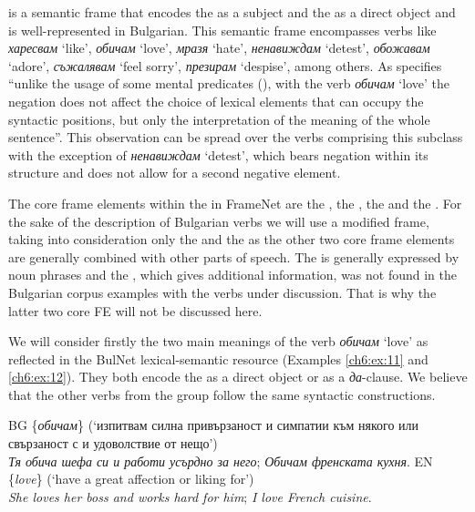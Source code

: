 \documentclass[output=paper,colorlinks,citecolor=brown]{langscibook}
\begin{document}
 is a semantic frame that encodes the  as a subject and the  as a direct object and is well-represented in Bulgarian. This semantic frame encompasses verbs like \textit{харесвам} `like', \textit{обичам} `love', \textit{мразя} `hate', \textit{ненавиждам} `detest', \textit{обожавам} `adore', \textit{съжалявам} `feel sorry', \textit{презирам} `despise', among others. As \citet[117]{tisheva2021наблюдения} specifies ``unlike the usage of some mental predicates (\cite[264]{ницолова2008проблематика}), with the verb \textit{обичам} `love' the negation does not affect the choice of lexical elements that can occupy the syntactic positions, but only the interpretation of the meaning of the whole sentence''. This observation can be spread over the verbs comprising this subclass with the exception of \textit{ненавиждам} `detest', which bears negation within its structure and does not allow for a second negative element. 
 


The core frame elements within the  in FrameNet are the , the , the  and the . For the sake of the description of Bulgarian verbs we will use a modified frame, taking into consideration only the  and the  as the other two core frame elements are generally combined with other parts of speech. The  is generally expressed by noun phrases and the , which gives additional information, was not found in the Bulgarian corpus examples with the verbs under discussion. That is why the latter two core FE will not be discussed here. 
 

We will consider firstly the two main meanings of the verb \textit{обичам} `love' as reflected in the BulNet lexical-semantic resource (Examples \ref{ch6:ex:11} and \ref{ch6:ex:12}). They both encode the  as a direct object or as a \textit{да}-clause. We believe that the other verbs from the group follow the same syntactic constructions.

\begin{exe} 
\ex  \label{ch6:ex:11} 
\begin{xlist}
\ex %
BG \{\textit{обичам}\} (`изпитвам силна привързаност и симпатии към ня\-кого или свързаност с и удоволствие от нещо')\\
\textit{Тя обича шефа си и работи усърдно за него}; \textit{Обичам френската кухня}.
\ex %
EN \{\textit{love}\} (`have a great affection or liking for’)\\
\textit{She loves her boss and works hard for him}; \textit{I love French cuisine}.
\end{xlist}
\end{exe}\textit{}
\end{document}
